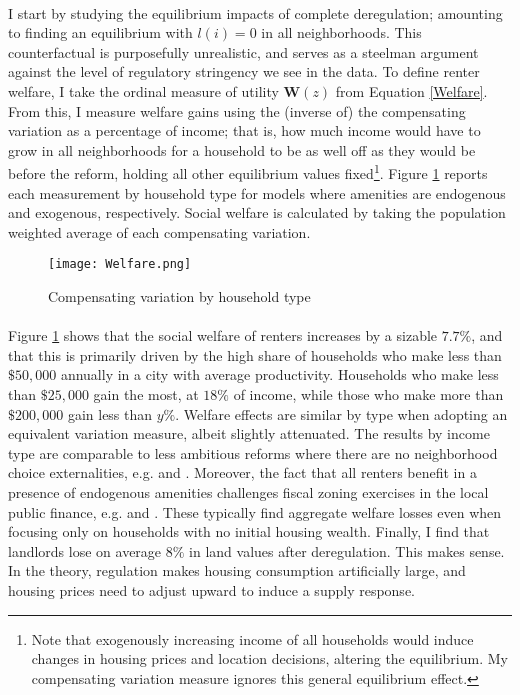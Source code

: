 \documentclass[11pt]{article}
\begin{document}
\paragraph*{}
I start by studying the equilibrium impacts of complete deregulation; amounting to finding an equilibrium with $l(i) = 0$ in all neighborhoods. This counterfactual is purposefully unrealistic, and serves as a steelman argument against the level of regulatory stringency we see in the data. To define renter welfare, I take the ordinal measure of utility $\boldsymbol{W}(z)$ from Equation \eqref{Welfare}. From this, I measure welfare gains using the (inverse of) the compensating variation as a percentage of income; that is, how much income would have to grow in all neighborhoods for a household to be as well off as they would be before the reform, holding all other equilibrium values fixed\footnote{Note that exogenously increasing income of all households would induce changes in housing prices and location decisions, altering the equilibrium. My compensating variation measure ignores this general equilibrium effect.}. Figure \ref{figure:welfare_ctfl} reports each measurement by household type for models where amenities are endogenous and exogenous, respectively. Social welfare is calculated by taking the population weighted average of each compensating variation.

\begin{figure}[htbp]
	\begin{center}
		\texttt{[image: Welfare.png]}
	\end{center}
	\caption{Compensating variation by household type}\label{figure:welfare_ctfl}
\end{figure}

\paragraph*{} Figure \ref{figure:welfare_ctfl} shows that the social welfare of renters increases by a sizable $7.7\%$, and that this is primarily driven by the high share of households who make less than $\$50,000$ annually in a city with average productivity. Households who make less than $\$25,000$ gain the most, at $18\%$ of income, while those who make more than $\$200,000$ gain less than $y\%$. Welfare effects are similar by type when adopting an equivalent variation measure, albeit slightly attenuated. The results by income type are comparable to less ambitious reforms where there are no neighborhood choice externalities, e.g. \cite{Song} and \cite{kulka}. Moreover, the fact that all renters benefit in a presence of endogenous amenities challenges fiscal zoning exercises in the local public finance, e.g. \cite{calabresetal} and \cite{ineffTiebout}. These typically find aggregate welfare losses even when focusing only on households with no initial housing wealth. Finally, I find that landlords lose on average $8\%$ in land values after deregulation. This makes sense. In the theory, regulation makes housing consumption artificially large, and housing prices need to adjust upward to induce a supply response.
\end{document}
